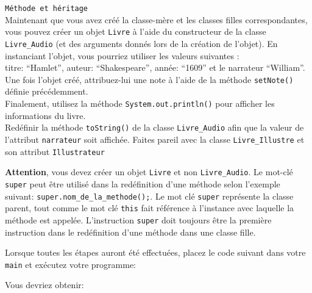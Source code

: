 \begin{Exercice}[10 minutes] \lstinline{Méthode et héritage} \\
Maintenant que vous avez créé la classe-mère et les classes filles correspondantes, vous pouvez créer un objet \lstinline{Livre} à l'aide du constructeur de la classe \lstinline{Livre_Audio} (et des arguments donnés lors de la création de l'objet).
En instanciant l'objet, vous pourriez utiliser les valeurs suivantes :\\
titre: ``Hamlet'', auteur: ``Shakespeare'', année: ``1609'' et le narrateur ``William''.\\
Une fois l'objet créé, attribuez-lui une note à l'aide de la méthode \lstinline{setNote()} définie précédemment.\\ 
Finalement, utilisez la méthode \lstinline{System.out.println()} pour afficher les informations du livre.\\
Redéfinir la méthode \lstinline{toString()} de la classe \lstinline{Livre_Audio} afin que la valeur de l'attribut \lstinline{narrateur} soit affichée.
Faites pareil avec la classe \lstinline{Livre_Illustre} et son attribut \lstinline{Illustrateur}
\begin{conseil}
\textbf{Attention}, vous devez créer un objet \lstinline{Livre} et non \lstinline{Livre_Audio}.
Le mot-clé \lstinline{super} peut être utilisé dans la redéfinition d'une méthode selon l'exemple suivant: \lstinline{super.nom_de_la_methode();}. Le mot clé \lstinline{super} représente la classe parent, tout comme le mot clé \lstinline{this} fait référence à l'instance avec laquelle la méthode est appelée. 
L'instruction \lstinline{super} doit toujours être la première instruction dans le redéfinition d'une méthode dans une classe fille. 
\end{conseil}
\begin{solution}
	
	
\end{solution}
\end{Exercice}
\newpage
Lorsque toutes les étapes auront été effectuées, placez le code suivant dans votre \lstinline{main} et exécutez votre programme:

Vous devriez obtenir:

\newpage

